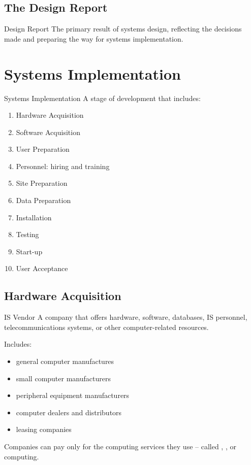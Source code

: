 \documentclass[\main/notes.tex]{subfiles}
\begin{document}
			\subsection{The Design Report}
				\begin{definition}{Design Report}
					The primary result of systems design, reflecting the decisions made and preparing the way for systems implementation.
				\end{definition}

		\pagebreak
		\section{Systems Implementation}
			\begin{definition}{Systems Implementation}
				A stage of development that includes:
				\begin{multicols}{2}
					\begin{enumerate}[nosep]
						\item Hardware Acquisition
						\item Software Acquisition
						\item User Preparation
						\item Personnel: hiring and training
						\item Site Preparation
						\item Data Preparation
						\item Installation
						\item Testing
						\item Start-up
						\item User Acceptance
					\end{enumerate}
				\end{multicols}
			\end{definition}
			\subsection{Hardware Acquisition}
				\begin{definition}{IS Vendor}
					A company that offers hardware, software, databases, IS personnel, telecommunications systems, or other computer-related resources.

					Includes:
					\begin{multicols}{2}
						\begin{itemize}[nosep]
							\item general computer manufactures
							\item small computer manufacturers
							\item peripheral equipment manufacturers
							\item computer dealers and distributors
							\item leasing companies
						\end{itemize}
					\end{multicols}

					Companies can pay only for the computing services they use -- called , , or \concept{utility} computing.
				\end{definition}
\end{document}
